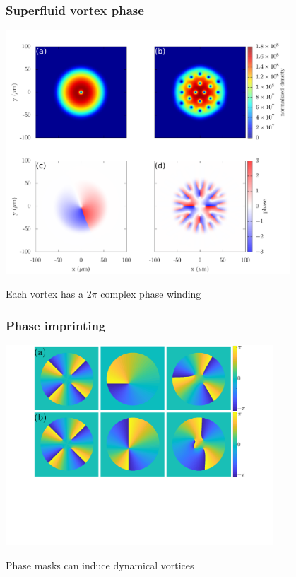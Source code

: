 \documentclass{beamer}
\begin{document}
\begin{frame}
\frametitle{Superfluid vortex phase}
\center \includegraphics[width=0.8\textwidth]{../data/splitop/rot/WIP.pdf}

Each vortex has a $2\pi$ complex phase winding
\end{frame}

\begin{frame}
\frametitle{Phase imprinting}
\center \includegraphics[width=0.75\textwidth]{../data/2d/phase/phase}


Phase masks can induce dynamical vortices

\end{frame}
\end{document}
